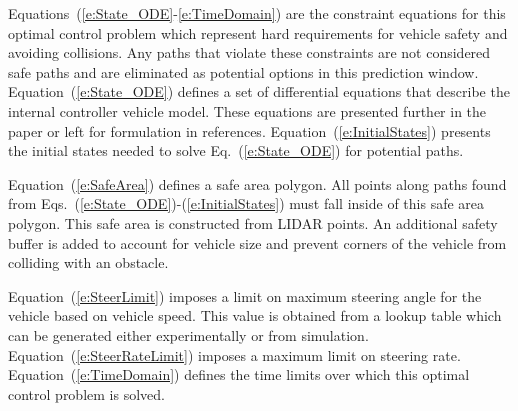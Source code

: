 \documentclass[12pt,twocolumn]{article}
\begin{document}
Equations~(\ref{e:State_ODE}-\ref{e:TimeDomain}) are the constraint equations for this optimal control problem which represent hard requirements for vehicle safety and avoiding collisions. Any paths that violate these constraints are not considered safe paths and are eliminated as potential options in this prediction window. Equation~(\ref{e:State_ODE}) defines a set of differential equations that describe the internal controller vehicle model. These equations are presented further in the paper or left for formulation in references. Equation~(\ref{e:InitialStates}) presents the initial states needed to solve Eq.~(\ref{e:State_ODE}) for potential paths. 

Equation~(\ref{e:SafeArea}) defines a safe area polygon. All points along paths found from Eqs.~(\ref{e:State_ODE})-(\ref{e:InitialStates}) must fall inside of this safe area polygon. This safe area is constructed from LIDAR points. An additional safety buffer is added to account for vehicle size and prevent corners of the vehicle from colliding with an obstacle. 

Equation~(\ref{e:SteerLimit}) imposes a limit on maximum steering angle for the vehicle based on vehicle speed. This value is obtained from a lookup table which can be generated either experimentally or from simulation. Equation~(\ref{e:SteerRateLimit}) imposes a maximum limit on steering rate. Equation~(\ref{e:TimeDomain}) defines the time limits over which this optimal control problem is solved.
\end{document}
